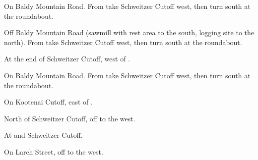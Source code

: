 
\begin{LocationList}

On Baldy Mountain Road.
From   take Schweitzer Cutoff west, then turn south at the roundabout.

Off Baldy Mountain Road (sawmill with rest area to the south, logging site to the north).
From   take Schweitzer Cutoff west, then turn south at the roundabout.

At the end of Schweitzer Cutoff, west of  .

On Baldy Mountain Road.
From   take Schweitzer Cutoff west, then turn south at the roundabout.

On Kootenai Cutoff, east of  .

North of Schweitzer Cutoff, off   to the west.

\Location{\TruckStop \Gas \Rest}
At   and Schweitzer Cutoff.

On Larch Street, off  to the west.

\end{LocationList}
